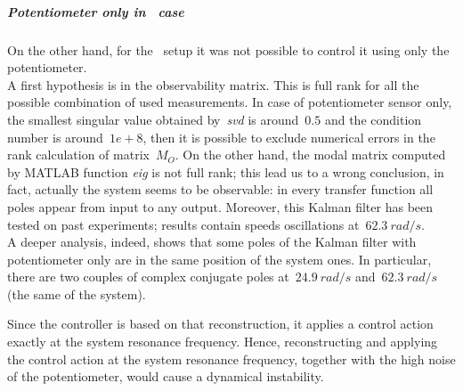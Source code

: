 \subparagraph{Potentiometer only in \twodof\ case}
On the other hand, for the \twodof\ setup it was not possible to control it using only the potentiometer. \\
A first hypothesis is in the observability matrix. This is full rank for all the possible combination of used measurements. In case of potentiometer sensor only, the smallest singular value obtained by~\textit{svd} is around~$0.5$ and the condition number is around~$1e+8$, then it is possible to exclude numerical errors in the rank calculation of matrix~$M_O$. On the other hand, the modal matrix computed by MATLAB function \textit{eig} is not full rank; this lead us to a wrong conclusion, in fact, actually the system seems to be observable: in every transfer function all poles appear from input to any output. Moreover, this Kalman filter has been tested on past experiments; results contain speeds oscillations at~$62.3\ rad/s$. \\
A deeper analysis, indeed, shows that some poles of the Kalman filter with potentiometer only are in the same position of the system ones. In particular, there are two couples of complex conjugate poles at~$24.9\ rad/s$ and~$62.3\ rad/s$ (the same of the system). \\
\label{SVD_explaination}
\par Since the controller is based on that reconstruction, it applies a control action exactly at the system resonance frequency. Hence, reconstructing and applying the control action at the system resonance frequency, together with the high noise of the potentiometer, would cause a dynamical instability.